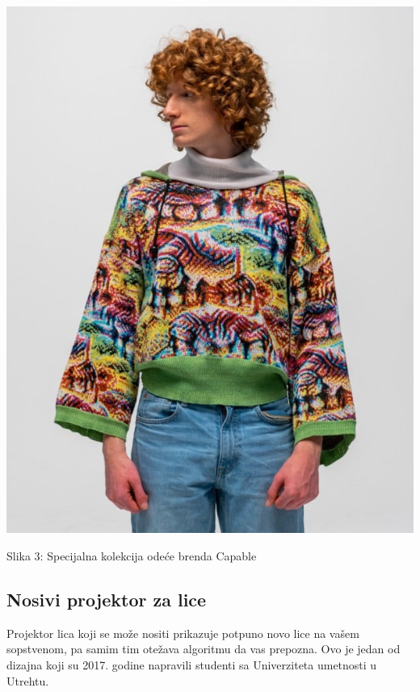 \documentclass{article}
\begin{document}
\begin{center}
\begin{minipage}{0.5\textwidth}
\includegraphics[width=\textwidth]{odeca2.jpg}
\end{minipage}

\vspace{0.5cm}

Slika 3: Specijalna kolekcija odeće brenda Capable
\end{center}

\subsection{Nosivi projektor za lice}
Projektor lica koji se može nositi prikazuje potpuno novo lice na vašem sopstvenom, pa samim tim otežava algoritmu da vas prepozna. Ovo je jedan od dizajna koji su 2017. godine napravili studenti sa Univerziteta umetnosti u Utrehtu. 
\end{document}
